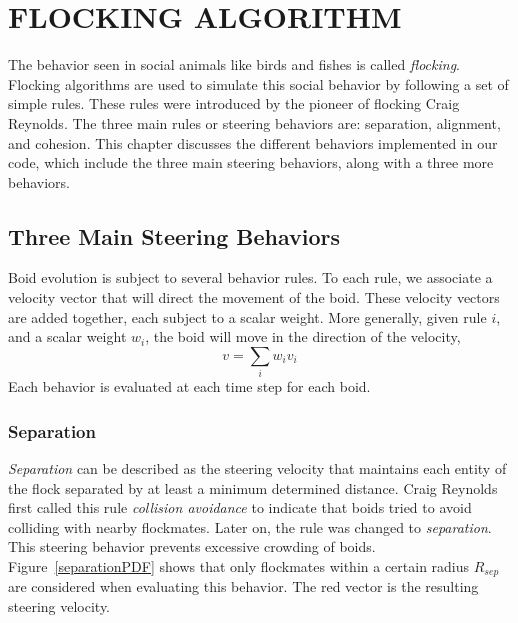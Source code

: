 \chapter{FLOCKING ALGORITHM}\label{chap3}

The behavior seen in social animals like birds and fishes is called \textit{flocking}. Flocking algorithms are used to simulate this social behavior by following a set of simple rules. These rules were introduced by the pioneer of flocking Craig Reynolds\cite{craig1}. The three main rules or steering behaviors are: separation, alignment, and cohesion. This chapter discusses the different behaviors implemented in our code, which include the three main steering behaviors, along with a three more behaviors.

\section{Three Main Steering Behaviors}
Boid evolution is subject to several behavior rules. To each rule, we associate a velocity vector that will direct the movement of the boid. These velocity vectors are added together, each subject to a scalar weight. More generally, given rule $i$, and a scalar weight $w_i$, the boid will move in the direction of the velocity, 
$$
v = \sum_i w_i v_i
$$
Each behavior is evaluated at each time step for each boid.

\subsection{Separation}\label{separationsection}
\textit{Separation} can be described as the steering velocity that maintains each entity of the flock separated by at least a minimum determined distance. Craig Reynolds first called this rule \textit{collision avoidance} to indicate that boids tried to avoid colliding with nearby flockmates. Later on, the rule was changed to \textit{separation}. This steering behavior prevents excessive crowding of boids. Figure~\ref{separationPDF} shows that only flockmates within a certain radius $R_{sep}$ are considered when evaluating this behavior. The red vector is the resulting steering velocity.

